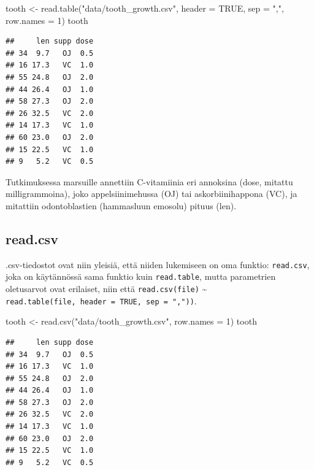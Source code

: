 \documentclass[
]{book}
\newenvironment{Shaded}{\begin{snugshade}}{\end{snugshade}}
\newcommand{\AttributeTok}[1]{\textcolor[rgb]{0.77,0.63,0.00}{#1}}
\newcommand{\ConstantTok}[1]{\textcolor[rgb]{0.00,0.00,0.00}{#1}}
\newcommand{\DecValTok}[1]{\textcolor[rgb]{0.00,0.00,0.81}{#1}}
\newcommand{\FunctionTok}[1]{\textcolor[rgb]{0.00,0.00,0.00}{#1}}
\newcommand{\NormalTok}[1]{#1}
\newcommand{\OtherTok}[1]{\textcolor[rgb]{0.56,0.35,0.01}{#1}}
\newcommand{\StringTok}[1]{\textcolor[rgb]{0.31,0.60,0.02}{#1}}
\begin{document}
\begin{Shaded}
\begin{Highlighting}[]
\NormalTok{tooth }\OtherTok{\textless{}{-}} \FunctionTok{read.table}\NormalTok{(}\StringTok{"data/tooth\_growth.csv"}\NormalTok{, }\AttributeTok{header =} \ConstantTok{TRUE}\NormalTok{, }\AttributeTok{sep =} \StringTok{","}\NormalTok{, }\AttributeTok{row.names =} \DecValTok{1}\NormalTok{)}
\NormalTok{tooth}
\end{Highlighting}
\end{Shaded}

\begin{verbatim}
##     len supp dose
## 34  9.7   OJ  0.5
## 16 17.3   VC  1.0
## 55 24.8   OJ  2.0
## 44 26.4   OJ  1.0
## 58 27.3   OJ  2.0
## 26 32.5   VC  2.0
## 14 17.3   VC  1.0
## 60 23.0   OJ  2.0
## 15 22.5   VC  1.0
## 9   5.2   VC  0.5
\end{verbatim}

Tutkimuksessa marsuille annettiin C-vitamiinia eri annoksina (dose, mitattu milligrammoina), joko appelsiinimehussa (OJ) tai askorbiinihappona (VC), ja mitattiin odontoblastien (hammasluun emosolu) pituus (len).

\hypertarget{read.csv}{%
\subsection{read.csv}\label{read.csv}}

.csv-tiedostot ovat niin yleisiä, että niiden lukemiseen on oma funktio: \texttt{read.csv}, joka on käytännössä sama funktio kuin \texttt{read.table}, mutta parametrien oletusarvot ovat erilaiset, niin että \texttt{read.csv(file)} \textasciitilde{} \texttt{read.table(file,\ header\ =\ TRUE,\ sep\ =\ ","))}.

\begin{Shaded}
\begin{Highlighting}[]
\NormalTok{tooth }\OtherTok{\textless{}{-}} \FunctionTok{read.csv}\NormalTok{(}\StringTok{"data/tooth\_growth.csv"}\NormalTok{, }\AttributeTok{row.names =} \DecValTok{1}\NormalTok{)}
\NormalTok{tooth}
\end{Highlighting}
\end{Shaded}

\begin{verbatim}
##     len supp dose
## 34  9.7   OJ  0.5
## 16 17.3   VC  1.0
## 55 24.8   OJ  2.0
## 44 26.4   OJ  1.0
## 58 27.3   OJ  2.0
## 26 32.5   VC  2.0
## 14 17.3   VC  1.0
## 60 23.0   OJ  2.0
## 15 22.5   VC  1.0
## 9   5.2   VC  0.5
\end{verbatim}
\end{document}
